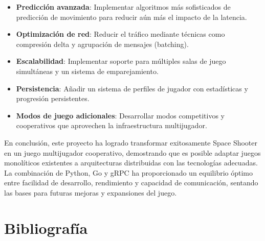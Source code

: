 \documentclass[12pt,letterpaper]{article}
\begin{document}
\begin{itemize}
    \item \textbf{Predicción avanzada}: Implementar algoritmos más sofisticados de predicción de movimiento para reducir aún más el impacto de la latencia.
    
    \item \textbf{Optimización de red}: Reducir el tráfico mediante técnicas como compresión delta y agrupación de mensajes (batching).
    
    \item \textbf{Escalabilidad}: Implementar soporte para múltiples salas de juego simultáneas y un sistema de emparejamiento.
    
    \item \textbf{Persistencia}: Añadir un sistema de perfiles de jugador con estadísticas y progresión persistentes.
    
    \item \textbf{Modos de juego adicionales}: Desarrollar modos competitivos y cooperativos que aprovechen la infraestructura multijugador.
\end{itemize}

En conclusión, este proyecto ha logrado transformar exitosamente Space Shooter en un juego multijugador cooperativo, demostrando que es posible adaptar juegos monolíticos existentes a arquitecturas distribuidas con las tecnologías adecuadas. La combinación de Python, Go y gRPC ha proporcionado un equilibrio óptimo entre facilidad de desarrollo, rendimiento y capacidad de comunicación, sentando las bases para futuras mejoras y expansiones del juego.

\section{Bibliografía}
\end{document}
